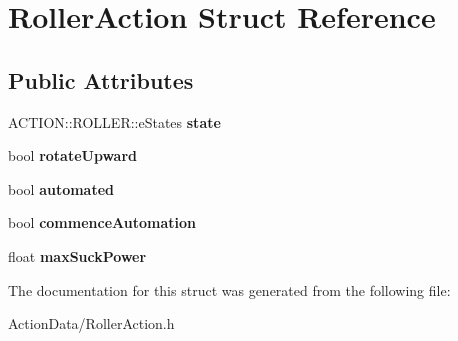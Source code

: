 \hypertarget{struct_roller_action}{
\section{\-Roller\-Action \-Struct \-Reference}
\label{struct_roller_action}
}
\subsection*{\-Public \-Attributes}
\begin{DoxyCompactItemize}
\item 
\hypertarget{struct_roller_action_ab27841d943cceac29cd46ccd4c68f682}{
\-A\-C\-T\-I\-O\-N\-::\-R\-O\-L\-L\-E\-R\-::e\-States {\bfseries state}}
\label{struct_roller_action_ab27841d943cceac29cd46ccd4c68f682}

\item 
\hypertarget{struct_roller_action_a8cef35f28c8460172a87b80c1deb1b3c}{
bool {\bfseries rotate\-Upward}}
\label{struct_roller_action_a8cef35f28c8460172a87b80c1deb1b3c}

\item 
\hypertarget{struct_roller_action_aa35555d28c61ed2d5d6429f41714d4f3}{
bool {\bfseries automated}}
\label{struct_roller_action_aa35555d28c61ed2d5d6429f41714d4f3}

\item 
\hypertarget{struct_roller_action_aaf939cb97ebf667542baad5d8576ed53}{
bool {\bfseries commence\-Automation}}
\label{struct_roller_action_aaf939cb97ebf667542baad5d8576ed53}

\item 
\hypertarget{struct_roller_action_a3c6e18fda3832086d6e40c4ee9e6613e}{
float {\bfseries max\-Suck\-Power}}
\label{struct_roller_action_a3c6e18fda3832086d6e40c4ee9e6613e}

\end{DoxyCompactItemize}


\-The documentation for this struct was generated from the following file\-:\begin{DoxyCompactItemize}
\item 
\-Action\-Data/\-Roller\-Action.\-h\end{DoxyCompactItemize}
